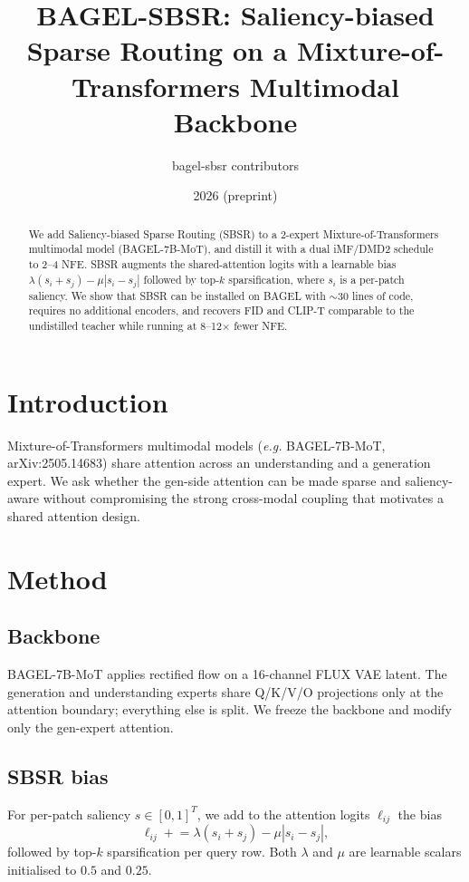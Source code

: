 \documentclass[10pt,letterpaper]{article}
\title{BAGEL-SBSR: Saliency-biased Sparse Routing on a Mixture-of-Transformers Multimodal Backbone}
\author{bagel-sbsr contributors}
\date{2026 (preprint)}
\begin{document}
\maketitle

\begin{abstract}
We add Saliency-biased Sparse Routing (SBSR) to a 2-expert
Mixture-of-Transformers multimodal model (BAGEL-7B-MoT), and distill it
with a dual iMF/DMD2 schedule to 2--4 NFE. SBSR augments the shared-attention
logits with a learnable bias $\lambda(s_i+s_j) - \mu|s_i-s_j|$ followed by
top-$k$ sparsification, where $s_i$ is a per-patch saliency. We show that
SBSR can be installed on BAGEL with $\sim$30 lines of code, requires no
additional encoders, and recovers FID and CLIP-T comparable to the
undistilled teacher while running at 8--12$\times$ fewer NFE.
\end{abstract}

\section{Introduction}
Mixture-of-Transformers multimodal models (\textit{e.g.\@} BAGEL-7B-MoT,
arXiv:2505.14683) share attention across an understanding and a
generation expert. We ask whether the gen-side attention can be made
sparse and saliency-aware without compromising the strong cross-modal
coupling that motivates a shared attention design.

\section{Method}

\subsection{Backbone}
BAGEL-7B-MoT applies rectified flow on a 16-channel FLUX VAE latent. The
generation and understanding experts share Q/K/V/O projections only at
the attention boundary; everything else is split. We freeze the
backbone and modify only the gen-expert attention.

\subsection{SBSR bias}
For per-patch saliency $s \in [0,1]^{T}$, we add to the attention
logits $\ell_{ij}$ the bias
\[
\ell_{ij} \mathrel{+}= \lambda(s_i + s_j) - \mu|s_i - s_j|,
\]
followed by top-$k$ sparsification per query row. Both $\lambda$ and
$\mu$ are learnable scalars initialised to $0.5$ and $0.25$.
\end{document}
